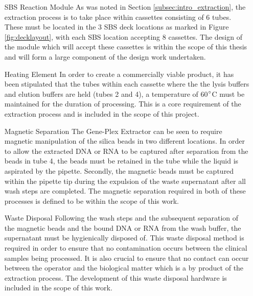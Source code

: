 \begin{enumerate}
	\item [SBS Reaction Module] As was noted in Section \ref{subsec:intro_extraction}, the extraction process is to take place within cassettes consisting of 6 tubes. These must be located in the 3 SBS deck locations as marked in Figure \ref{fig:decklayout}, with each SBS location accepting 8 cassettes. The design of the module which will accept these cassettes is within the scope of this thesis and will form a large component of the design work undertaken.

	\item [Heating Element] In order to create a commercially viable product, it has been stipulated that the tubes within each cassette where the the lysis buffers and elution buffers are held (tubes 2 and 4), a temperature of 60$\degree$C must be maintained for the duration of processing. This is a core requirement of the extraction process and is included in the scope of this project.

	\item [Magnetic Separation] The Gene-Plex Extractor can be seen to require magnetic manipulation of the silica beads in two different locations. In order to allow the extracted DNA or RNA to be captured after separation from the beads in tube 4, the beads must be retained in the tube while the liquid is aspirated by the pipette. Secondly, the magnetic beads must be captured within the pipette tip during the expulsion of the waste supernatant after all wash steps are completed. The magnetic separation required in both of these processes is defined to be within the scope of this work. 

	\item [Waste Disposal] Following the wash steps and the subsequent separation of the magnetic beads and the bound DNA or RNA from the wash buffer, the supernatant must be hygienically disposed of. This waste disposal method is required in order to ensure that no contamination occurs between the clinical samples being processed. It is also crucial to ensure that no contact can occur between the operator and the biological matter which is a by product of the extraction process. The development of this waste disposal hardware is included in the scope of this work.
	
\end{enumerate}

